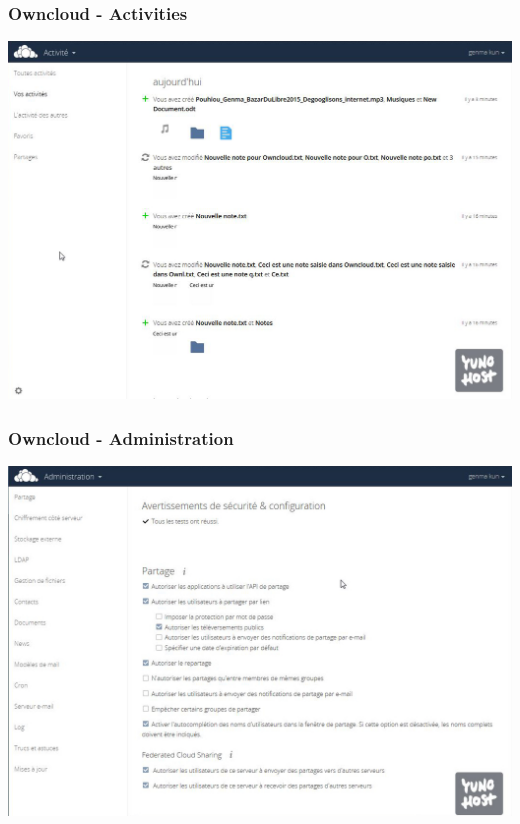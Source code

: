 \documentclass{beamer}
\begin{document}
\begin{frame}
\frametitle{Owncloud - Activities}
\includegraphics[scale=0.3] {./Owncloud/Owncloud_Activites.jpg}
\end{frame}

\begin{frame}
\frametitle{Owncloud - Administration}
\includegraphics[scale=0.3] {./Owncloud/Owncloud_Administration.jpg}
\end{frame}
\end{document}
